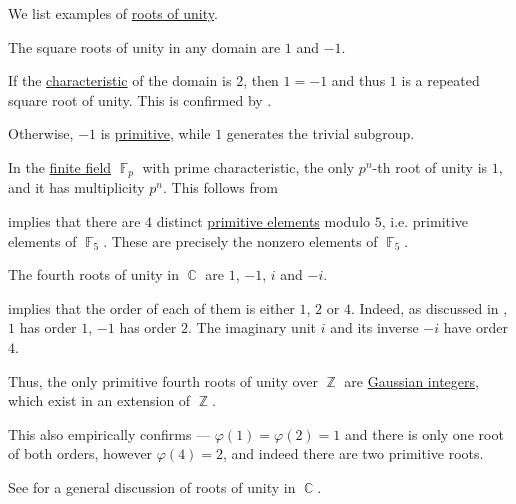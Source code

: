 \begin{example}\label{ex:def:root_of_unity}
  We list examples of \hyperref[def:root_of_unity]{roots of unity}.
  \begin{thmenum}
     The square roots of unity in any domain are \( 1 \) and \( -1 \).

    If the \hyperref[def:ring_characteristic]{characteristic} of the domain is \( 2 \), then \( 1 = -1 \) and thus \( 1 \) is a repeated square root of unity. This is confirmed by .

    Otherwise, \( -1 \) is \hyperref[def:primitive_root_of_unity]{primitive}, while \( 1 \) generates the trivial subgroup.

     In the \hyperref[def:finite_field]{finite field} \( \BbbF_p \) with prime characteristic, the only \( p^n \)-th root of unity is \( 1 \), and it has multiplicity \( p^n \). This follows from 

      implies that there are \( 4 \) distinct \hyperref[def:finite_field_primitive_element]{primitive elements} modulo \( 5 \), i.e. primitive elements of \( \BbbF_5 \). These are precisely the nonzero elements of \( \BbbF_5 \).

     The fourth roots of unity in \( \BbbC \) are \( 1 \), \( -1 \), \( i \) and \( -i \).

     implies that the order of each of them is either \( 1 \), \( 2 \) or \( 4 \). Indeed, as discussed in , \( 1 \) has order \( 1 \), \( -1 \) has order \( 2 \). The imaginary unit \( i \) and its inverse \( -i \) have order \( 4 \).

    Thus, the only primitive fourth roots of unity over \( \BbbZ \) are \hyperref[def:gaussian_integer]{Gaussian integers}, which exist in an extension of \( \BbbZ \).

    This also empirically confirms  --- \( \varphi(1) = \varphi(2) = 1 \) and there is only one root of both orders, however \( \varphi(4) = 2 \), and indeed there are two primitive roots.

    See  for a general discussion of roots of unity in \( \BbbC \).


\end{thmenum}
\end{example}
